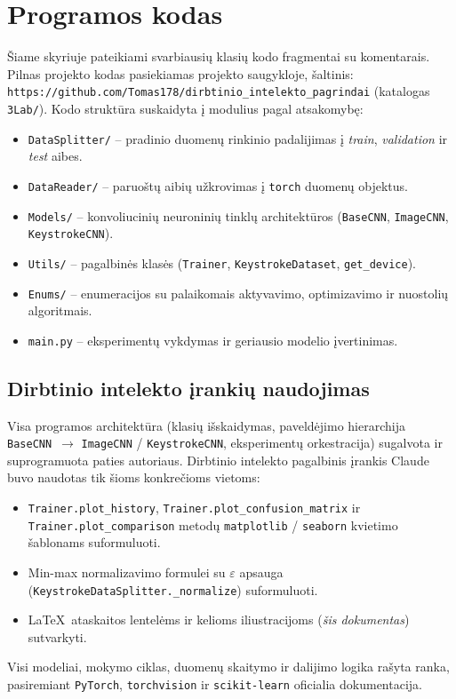 \section{Programos kodas}
\label{sec:programos_kodas}

Šiame skyriuje pateikiami svarbiausių klasių kodo fragmentai su komentarais. Pilnas projekto kodas pasiekiamas projekto saugykloje, šaltinis: \texttt{https://github.com/Tomas178/dirbtinio\_intelekto\_pagrindai} (katalogas \texttt{3Lab/}). Kodo struktūra suskaidyta į modulius pagal atsakomybę:
\begin{itemize}
    \item \texttt{DataSplitter/} – pradinio duomenų rinkinio padalijimas į \textit{train}, \textit{validation} ir \textit{test} aibes.
    \item \texttt{DataReader/} – paruoštų aibių užkrovimas į \texttt{torch} duomenų objektus.
    \item \texttt{Models/} – konvoliucinių neuroninių tinklų architektūros (\texttt{BaseCNN}, \texttt{ImageCNN}, \texttt{KeystrokeCNN}).
    \item \texttt{Utils/} – pagalbinės klasės (\texttt{Trainer}, \texttt{KeystrokeDataset}, \texttt{get\_device}).
    \item \texttt{Enums/} – enumeracijos su palaikomais aktyvavimo, optimizavimo ir nuostolių algoritmais.
    \item \texttt{main.py} – eksperimentų vykdymas ir geriausio modelio įvertinimas.
\end{itemize}

\subsection{Dirbtinio intelekto įrankių naudojimas}
\label{subsec:di_panaudojimas}

Visa programos architektūra (klasių išskaidymas, paveldėjimo hierarchija \texttt{BaseCNN}~$\rightarrow$ \texttt{ImageCNN} / \texttt{KeystrokeCNN}, eksperimentų orkestracija) sugalvota ir suprogramuota paties autoriaus. Dirbtinio intelekto pagalbinis įrankis Claude~\cite{claude_bendrai} buvo naudotas tik šioms konkrečioms vietoms:
\begin{itemize}
    \item \texttt{Trainer.plot\_history}, \texttt{Trainer.plot\_confusion\_matrix} ir \texttt{Trainer.plot\_comparison} metodų \texttt{matplotlib} / \texttt{seaborn} kvietimo šablonams suformuluoti.
    \item Min-max normalizavimo formulei su $\varepsilon$ apsauga (\texttt{KeystrokeDataSplitter.\_normalize}) suformuluoti.
    \item \LaTeX\ ataskaitos lentelėms ir kelioms iliustracijoms (\textit{šis dokumentas}) sutvarkyti.
\end{itemize}
Visi modeliai, mokymo ciklas, duomenų skaitymo ir dalijimo logika rašyta ranka, pasiremiant \texttt{PyTorch}, \texttt{torchvision} ir \texttt{scikit-learn} oficialia dokumentacija.

